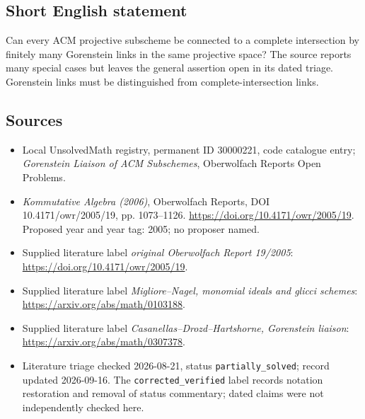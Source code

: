 \documentclass[11pt]{article}
\begin{document}
\subsection{Short English statement}
Can every ACM projective subscheme be connected to a complete intersection by finitely many Gorenstein links in the same projective space? The source reports many special cases but leaves the general assertion open in its dated triage. Gorenstein links must be distinguished from complete-intersection links.
\subsection{Sources}
\begin{itemize}\item Local UnsolvedMath registry, permanent ID 30000221, code catalogue entry; \emph{Gorenstein Liaison of ACM Subschemes}, Oberwolfach Reports Open Problems.\item \emph{Kommutative Algebra (2006)}, Oberwolfach Reports, DOI 10.4171/owr/2005/19, pp. 1073--1126. \url{https://doi.org/10.4171/owr/2005/19}. Proposed year and year tag: 2005; no proposer named.\item Supplied literature label \emph{original Oberwolfach Report 19/2005}: \url{https://doi.org/10.4171/owr/2005/19}.\item Supplied literature label \emph{Migliore--Nagel, monomial ideals and glicci schemes}: \url{https://arxiv.org/abs/math/0103188}.\item Supplied literature label \emph{Casanellas--Drozd--Hartshorne, Gorenstein liaison}: \url{https://arxiv.org/abs/math/0307378}.\item Literature triage checked 2026-08-21, status \texttt{partially\_solved}; record updated 2026-09-16. The \texttt{corrected\_verified} label records notation restoration and removal of status commentary; dated claims were not independently checked here.\end{itemize}
\end{document}
